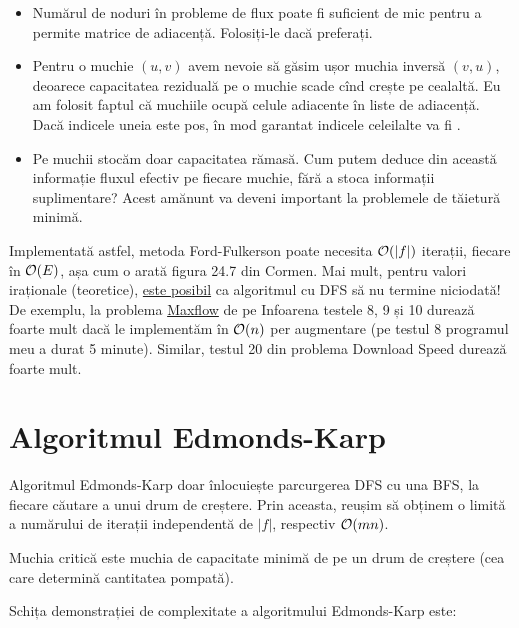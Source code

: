 \documentclass[../main.tex]{subfiles}
\begin{document}
\begin{itemize}
  \item Numărul de noduri în probleme de flux poate fi suficient de mic pentru a permite matrice de adiacență. Folosiți-le dacă preferați.

  \item Pentru o muchie $(u, v)$ avem nevoie să găsim ușor muchia inversă $(v, u)$, deoarece capacitatea reziduală pe o muchie scade cînd crește pe cealaltă. Eu am folosit faptul că muchiile ocupă celule adiacente în liste de adiacență. Dacă indicele uneia este pos, în mod garantat indicele celeilalte va fi .

  \item Pe muchii stocăm doar capacitatea rămasă. Cum putem deduce din această informație fluxul efectiv pe fiecare muchie, fără a stoca informații suplimentare? Acest amănunt va deveni important la problemele de tăietură minimă.
\end{itemize}

Implementată astfel, metoda Ford-Fulkerson poate necesita $\mathcal{O}(|f|)$ iterații, fiecare în $\mathcal{O}(E)$, așa cum o arată figura 24.7 din Cormen. Mai mult, pentru valori iraționale (teoretice), \href{https://www.sciencedirect.com/science/article/pii/030439759500022O}{este posibil} ca algoritmul cu DFS să nu termine niciodată! De exemplu, la problema \href{https://infoarena.ro/problema/maxflow}{Maxflow} de pe Infoarena testele 8, 9 și 10 durează foarte mult dacă le implementăm în $\mathcal{O}(n)$ per augmentare (pe testul 8 programul meu a durat 5 minute). Similar, testul 20 din problema Download Speed durează foarte mult.

\section{Algoritmul Edmonds-Karp}

Algoritmul Edmonds-Karp doar înlocuiește parcurgerea DFS cu una BFS, la fiecare căutare a unui drum de creștere. Prin aceasta, reușim să obținem o limită a numărului de iterații independentă de $|f|$, respectiv $\mathcal{O}(mn)$.

\begin{definition}
  Muchia critică este muchia de capacitate minimă de pe un drum de creștere (cea care determină cantitatea pompată).
\end{definition}

Schița demonstrației de complexitate a algoritmului Edmonds-Karp este:
\end{document}
